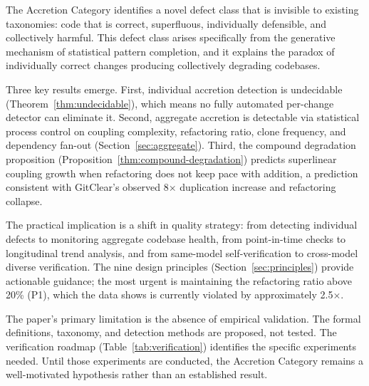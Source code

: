 \documentclass[11pt, a4paper, logo, copyright]{googledeepmind}
\begin{document}
The Accretion Category identifies a novel defect class that is invisible to existing taxonomies: code that is correct, superfluous, individually defensible, and collectively harmful. This defect class arises specifically from the generative mechanism of statistical pattern completion, and it explains the paradox of individually correct changes producing collectively degrading codebases.

Three key results emerge. First, individual accretion detection is undecidable (Theorem~\ref{thm:undecidable}), which means no fully automated per-change detector can eliminate it. Second, aggregate accretion is detectable via statistical process control on coupling complexity, refactoring ratio, clone frequency, and dependency fan-out (Section~\ref{sec:aggregate}). Third, the compound degradation proposition (Proposition~\ref{thm:compound-degradation}) predicts superlinear coupling growth when refactoring does not keep pace with addition, a prediction consistent with GitClear's observed 8$\times$ duplication increase and refactoring collapse.

The practical implication is a shift in quality strategy: from detecting individual defects to monitoring aggregate codebase health, from point-in-time checks to longitudinal trend analysis, and from same-model self-verification to cross-model diverse verification. The nine design principles (Section~\ref{sec:principles}) provide actionable guidance; the most urgent is maintaining the refactoring ratio above 20\% (P1), which the data shows is currently violated by approximately 2.5$\times$.

The paper's primary limitation is the absence of empirical validation. The formal definitions, taxonomy, and detection methods are proposed, not tested. The verification roadmap (Table~\ref{tab:verification}) identifies the specific experiments needed. Until those experiments are conducted, the Accretion Category remains a well-motivated hypothesis rather than an established result.


\end{document}
